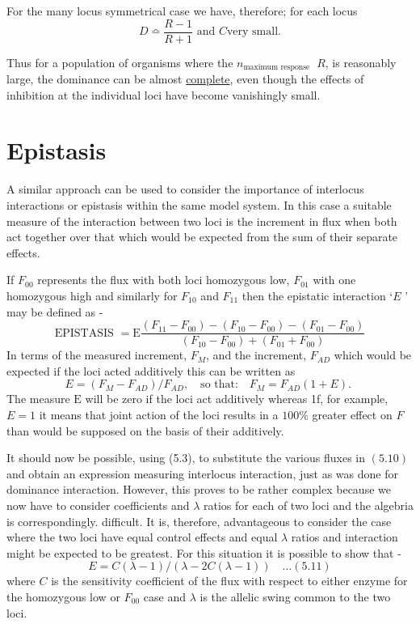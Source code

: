 For the many locus symmetrical case we have, therefore; for each locus
%
$$D \bumpeq \frac{R-1}{R+1} \mbox{ and } C \mbox{very small.} $$

Thus for a population of organisms where the $n_{\text {maximum response }}$ $R$, is reasonably large, the dominance can be almost \underline{complete}, even though the effects of inhibition at the individual loci have become vanishingly small.

\section{Epistasis}

A similar approach can be used to consider the importance of interlocus interactions or epistasis within the same model system. In this case a suitable measure of the interaction between two loci is the increment in flux when both act together over that which would be expected from the sum of their separate effects.

If $F_{00}$ represents the flux with both loci homozygous low, $F_{01}$ with one homozygous high and similarly for $F_{10}$ and $F_{11}$ then the epistatic interaction `$E$ ' may be defined as -
%
\begin{equation}
\mbox{EPISTASIS } = \mathrm{E} \frac{\left(F_{11}-F_{00}\right)-\left(F_{10}-F_{00}\right)-\left(F_{01}-F_{00}\right)}{\left(F_{10}-F_{00}\right)+\left(F_{01}+F_{00}\right)}
\label{eqn:510}
\end{equation}
%
In terms of the measured increment, $F_{M}$, and the increment, ${F}_{AD}$ which would be expected if the loci acted additively this can be written as
%
$$
E=\left(F_{M}-F_{A D}\right) / F_{A D}, \quad \text {so that:} \quad F_{M}=F_{A D}(1+E) \text {. }
$$
%
The measure $\mathrm{E}$ will be zero if the loci act additively whereas 1f, for example, $E=1$ it means that joint action of the loci results in a $100 \%$ greater effect on $F$ than would be supposed on the basis of their additively.

It should now be possible, using (5.3), to substitute the various fluxes in $(5.10)$ and obtain an expression measuring interlocus interaction, just as was done for dominance interaction. However, this proves to be rather complex because we now have to consider coefficients and $\lambda$ ratios for each of two loci and the algebria is correspondingly. difficult. It is, therefore, advantageous to consider the case where the two loci have equal control effects and equal $\lambda$ ratios and interaction might be expected to be greatest. For this situation it is possible to show that -
%
\begin{equation}
E = C (\lambda-1) /(\lambda-2 C(\lambda-1)) \quad \ldots(5.11)
\label{eqn:511}
\end{equation}
%
where $C$ is the sensitivity coefficient of the flux with respect to either enzyme for the homozygous low or $F_{00}$ case and $\lambda$ is the allelic swing common to the two loci.

